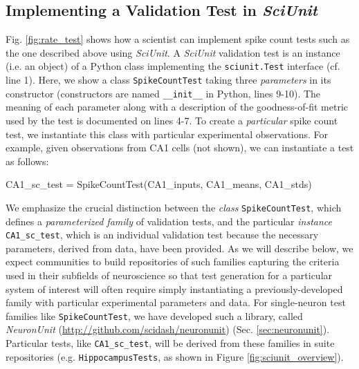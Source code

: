 \documentclass{frontiersSCNS}
\let\verbx\lstinline
\begin{document}
\subsection{Implementing a Validation Test in \textit{SciUnit}}
Fig. \ref{fig:rate_test} shows how a scientist can implement spike count tests such as the one described above using \textit{SciUnit}. 
A \textit{SciUnit} validation test is an {instance} (i.e. an object) of a Python class implementing the \verbx{sciunit.Test} interface (cf. line 1). 
Here, we show a class \verbx{SpikeCountTest} taking three \emph{parameters} in its constructor (constructors are named \verbx{__init__} in Python, lines 9-10). 
The meaning of each parameter along with a description of the goodness-of-fit metric used by the test is documented on lines 4-7. 
To create a \emph{particular} spike count test, we instantiate this class with particular experimental observations. 
For example, given observations from CA1 cells (not shown), we can instantiate a test as follows:
\begin{python}
  CA1_sc_test = SpikeCountTest(CA1_inputs, CA1_means, CA1_stds)
\end{python}
We emphasize the crucial distinction between the \textit{class} \verbx{SpikeCountTest}, which defines a \emph{parameterized family} of validation tests, and the particular \textit{instance} \verbx{CA1_sc_test}, which is an individual validation test because the necessary parameters, derived from data, have been provided. 
As we will describe below, we expect communities to build repositories of such families capturing the criteria used in their subfields of neuroscience so that test generation for a particular system of interest will often require simply instantiating a previously-developed family with particular experimental parameters and data. 
For single-neuron test families like \verbx{SpikeCountTest}, we have developed such a library, called \textit{NeuronUnit} (\url{http://github.com/scidash/neuronunit}) (Sec. \ref{sec:neuronunit}). Particular tests, like \verbx{CA1_sc_test}, will be derived from these families in suite repositories (e.g. \verbx{HippocampusTests}, as shown in Figure \ref{fig:sciunit_overview}).
\end{document}
